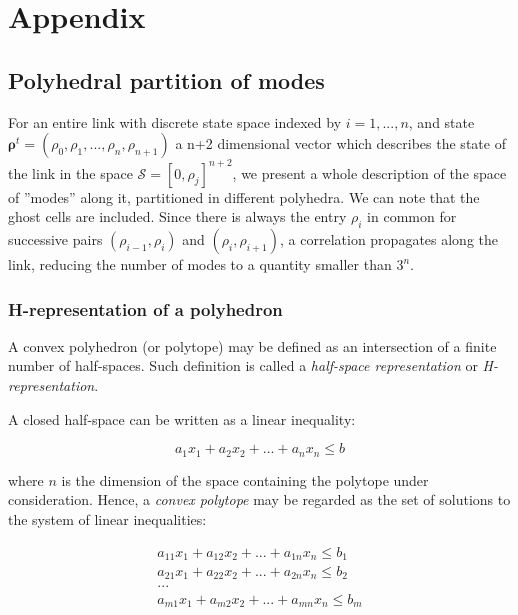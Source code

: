 \section{Appendix}

\subsection{Polyhedral partition of modes}

For an entire link with discrete state space indexed by $i = 1,...,n$, and state $\boldsymbol\rho^{t} = (\rho_{0},\rho_{1},...,\rho_{n},\rho_{n+1})$ a n+2 dimensional vector which describes the state of the link in the space $\mathcal{S} = [0,\rho_{j}]^{n+2}$, we present a whole description of the space of ''modes'' along it, partitioned in different polyhedra. We can note that the ghost cells are included. Since there is always the entry $\rho_{i}$ in common for successive pairs $(\rho_{i-1},\rho_{i})$ and $(\rho_{i},\rho_{i+1})$, a correlation propagates along the link, reducing the number of modes to a quantity smaller than $3^{n}$.


\subsubsection{H-representation of a polyhedron}\label{sec:polytope}

A convex polyhedron (or polytope) may be defined as an intersection of a finite number of half-spaces. Such definition is called a \textit{half-space representation} or \textit{H-representation}.

\noindent A closed half-space can be written as a linear inequality:

\begin{equation}
a_{1}x_{1} + a_{2}x_{2} + ... + a_{n}x_{n} \leq b
\label{eq:closedHalfSpace}
\end{equation}

\noindent where $n$ is the dimension of the space containing the polytope under consideration. Hence, a \textit{convex polytope} may be regarded as the set of solutions to the system of linear inequalities:

\begin{equation}
\begin{array}{l}
a_{11}x_{1} + a_{12}x_{2} + ... + a_{1n}x_{n} \leq b_{1}\\
a_{21}x_{1} + a_{22}x_{2} + ... + a_{2n}x_{n} \leq b_{2}\\
...\\
a_{m1}x_{1} + a_{m2}x_{2} + ... + a_{mn}x_{n} \leq b_{m}
\end{array}
\label{eq:hRepresentation}
\end{equation}

